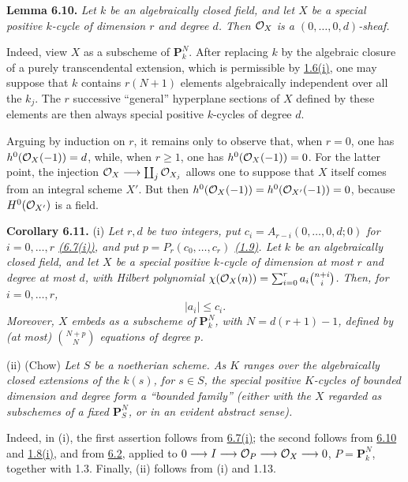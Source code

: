 \textbf{Lemma 6.10.} \emph{Let $k$ be an algebraically closed field, and let $X$ be a special positive $k$-cycle of dimension $r$ and degree $d$. Then $\mathcal O_X$ is a $(0,\ldots,0,d)$-sheaf.}

Indeed, view $X$ as a subscheme of $\mathbf P^N_k$. After replacing $k$ by the algebraic closure of a purely transcendental extension, which is permissible by \hyperlink{sga6.e13.prop.1-6}{1.6(i)}, one may suppose that $k$ contains $r(N+1)$ elements algebraically independent over all the $k_j$. The $r$ successive ``general'' hyperplane sections of $X$ defined by these elements are then always special positive $k$-cycles of degree $d$.

Arguing by induction on $r$, it remains only to observe that, when $r=0$,
one has $h^0(\mathcal O_X(-1))=d$, while, when $r\geq1$, one has
$h^0(\mathcal O_X(-1))=0$. For the latter point, the injection
$\mathcal O_X\longrightarrow\coprod_j\mathcal O_{X_j}$ allows one to suppose that $X$
itself comes from an integral scheme $X'$. But then
$h^0(\mathcal O_X(-1))=h^0(\mathcal O_{X'}(-1))=0$, because $H^0(\mathcal O_{X'})$ is a
field.

\textbf{Corollary 6.11.} (i) \emph{Let $r,d$ be two integers, put
$c_i=A_{r-i}(0,\ldots,0,d;0)$ for $i=0,\ldots,r$ \hyperlink{sga6.e13.thm.6-7}{(6.7(i))}, and put
$p=P_r(c_0,\ldots,c_r)$ \hyperlink{sga6.e13.def.1-9}{(1.9)}. Let $k$ be an algebraically closed field,
and let $X$ be a special positive $k$-cycle of dimension at most $r$ and
degree at most $d$, with Hilbert polynomial
$\chi(\mathcal O_X(n))=\sum_{i=0}^{r}a_i\binom{n+i}{i}$. Then, for
$i=0,\ldots,r$,}
\[
  |a_i|\leq c_i.
\]
\emph{Moreover, $X$ embeds as a subscheme of $\mathbf P^N_k$, with
$N=d(r+1)-1$, defined by (at most) $\binom{N+p}{N}$ equations of degree
$p$.}

(ii) (Chow) \emph{Let $S$ be a noetherian scheme. As $K$ ranges over
the algebraically closed extensions of the $k(s)$, for $s\in S$, the
special positive $K$-cycles of bounded dimension and degree form a
``bounded family'' (either with the $X$ regarded as subschemes of a fixed
$\mathbf P^N_S$, or in an evident abstract sense).}

Indeed, in (i), the first assertion follows from \hyperlink{sga6.e13.thm.6-7}{6.7(i)}; the second
follows from \hyperlink{sga6.e13.lem.6-10}{6.10} and \hyperlink{sga6.e13.prop.1-8}{1.8(i)}, and from \hyperlink{sga6.e13.lem.6-2}{6.2}, applied to
$0\longrightarrow I\longrightarrow\mathcal O_P\longrightarrow\mathcal O_X\longrightarrow0$,
$P=\mathbf P^N_k$, together with 1.3. Finally, (ii) follows from (i) and
1.13.

